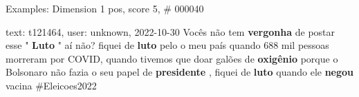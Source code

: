 \begin{frame}{Examples: Dimension 1 pos, score 5, \# 000040}
\footnotesize
\begin{exampleblock}{text: t121464, user: unknown, 2022-10-30}
Vocês não tem \textbf{vergonha} de postar esse " \textbf{Luto} " aí não? fiquei 
de \textbf{luto} pelo o meu país quando 688 mil pessoas morreram por COVID, 
quando tivemos que doar galões de \textbf{oxigênio} porque o Bolsonaro não 
fazia o seu papel de \textbf{presidente} , fiquei de \textbf{luto} quando ele 
\textbf{negou} vacina \#Eleicoes2022 
\end{exampleblock}
\end{frame}
